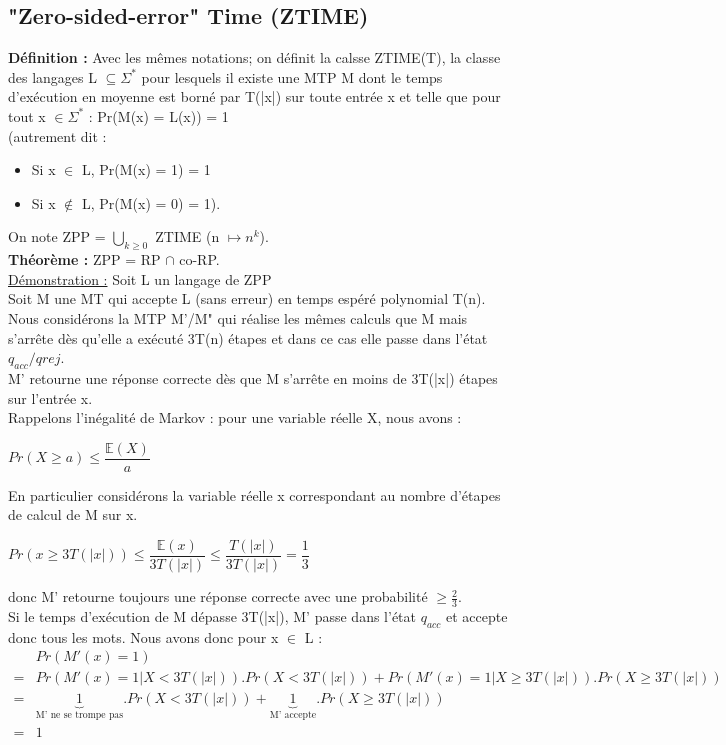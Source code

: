 \documentclass[12pt,a4paper]{article}
\begin{document}
\subsection{"Zero-sided-error" Time (ZTIME)}
\textbf{Définition :} Avec les mêmes notations; on définit la calsse ZTIME(T), la classe des langages L $\subseteq \Sigma^*$ pour lesquels il existe une MTP M dont le temps d'exécution en moyenne est borné par T(|x|) sur toute entrée x et telle que pour tout x $\in \Sigma^*$ : Pr(M(x) = L(x)) = 1\\(autrement dit :
\begin{itemize}
	\item Si x $\in$ L, Pr(M(x) = 1) = 1
	\item Si x $\not\in$ L, Pr(M(x) = 0) = 1).
\end{itemize}
On note ZPP = $\bigcup\limits_{k \geq 0}$ ZTIME (n $\longmapsto n^k$).\\
\textbf{Théorème :} ZPP = RP $\cap$ co-RP.\\
\underline{Démonstration :} Soit L un langage de ZPP\\
Soit M une MT qui accepte L (sans erreur) en temps espéré polynomial T(n).\\
Nous considérons la MTP M'/M" qui réalise les mêmes calculs que M mais s'arrête dès qu'elle a exécuté 3T(n) étapes et dans ce cas elle passe dans l'état $q_{acc}/q{rej}$.\\
M' retourne une réponse correcte dès que M s'arrête en moins de 3T(|x|) étapes sur l'entrée x.\\
Rappelons l'inégalité de Markov : pour une variable réelle X, nous avons :\\
\begin{center}
	$Pr(X \geq a) \leq \dfrac{\mathbb{E}(X)}{a}$
\end{center}
En particulier considérons la variable réelle x correspondant au nombre d'étapes de calcul de M sur x.
\begin{center}
	$Pr(x \geq 3T(|x|)) \leq \dfrac{\mathbb{E}(x)}{3T(|x|)} \leq \dfrac{T(|x|)}{3T(|x|)} = \dfrac{1}{3}$
\end{center}
donc M' retourne toujours une réponse correcte avec une probabilité $\geq \frac{2}{3}$.\\
Si le temps d'exécution de M dépasse 3T(|x|), M' passe dans l'état $q_{acc}$ et accepte donc tous les mots. Nous avons donc pour x $\in$ L :
\begin{equation}
\begin{split}\nonumber
& Pr(M'(x) = 1)\\
=& Pr(M'(x) = 1 | X < 3T(|x|)).Pr(X < 3T(|x|)) + Pr(M'(x) = 1 | X \geq 3T(|x|)).Pr(X \geq 3T(|x|))\\
=&\underbrace{1}_{\text{M' ne se trompe pas}}.Pr(X < 3T(|x|)) + \underbrace{1}_{\text{M' accepte}}.Pr(X \geq 3T(|x|))\\
=& 1
\end{split}
\end{equation}
\end{document}
